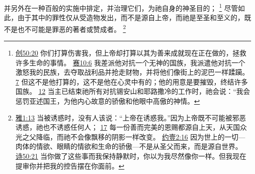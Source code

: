 \documentclass[12pt, a4paper, oneside]{ctexart}
\begin{document}
	并另外在一种百般的实施中排定，并治理它们，为祂自身的神圣目的；
	\footnote {
		\href{https://biblehub.com/genesis/50-20.htm}{创50:20} 你们打算伤害我，但上帝却打算以其为善来成就现在正在做的，拯救许多生命的事情。
		\href{https://biblehub.com/isaiah/10-6.htm}{赛10:6} 我差派他对抗一个无神的国族，我派遣他对抗一个激怒我的民族，去夺取战利品并抢走财物，并将他们像街上的泥巴一样蹂躏。
		\href{https://biblehub.com/isaiah/10-7.htm}{7} 但这不是他打算的，这不是他在心灵中有的；他的用意是要摧毁，终结许多国族。
		\href{https://biblehub.com/isaiah/10-12.htm}{12} 当主已结束祂所有对抗锡安山和耶路撒冷的工作时，祂会说：“我会惩罚亚述国王，为他内心故意的骄傲和他眼中高傲的神情。
	}
	尽管如此，由于其中的罪性仅从受造物发出，而不是源自上帝，而祂是至圣和至义的，既不是也不可能是罪恶的著者或赞成者。
	\footnote {
		\href{https://biblehub.com/james/1-13.htm}{雅1:13} 当被诱惑时，没有人该说：“上帝在诱惑我。”因为上帝既不可能被邪恶诱惑，祂也不诱惑任何人；
		\href{https://biblehub.com/james/1-17.htm}{17} 每一份善而完美的恩赐都源自上天，从天国众光之父降临，而祂不会像飘移的阴影一样改变。
		\href{https://biblehub.com/1_john/2-16.htm}{约壹2:16} 因为世上的一切---肉体的情欲、眼睛的情欲和生命的骄傲---不是从圣父而来，而是源自世界。
		\href{https://biblehub.com/psalms/50-21.htm}{诗50:21} 当你做了这些事而我保持静默时，你以为我尽然像你一样。但我现在提审你并把我的控告摆在你面前。
	}
\end{document}
